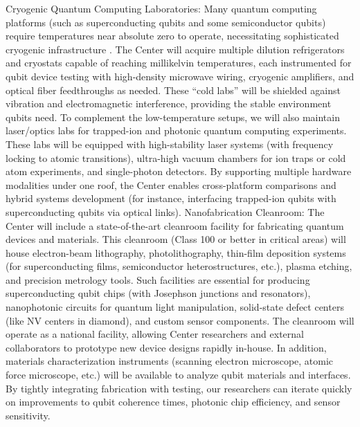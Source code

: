\documentclass[12pt]{article}
\begin{document}
Cryogenic Quantum Computing Laboratories: Many quantum computing platforms (such as superconducting qubits and some semiconductor qubits) require temperatures near absolute zero to operate, necessitating sophisticated cryogenic infrastructure . The Center will acquire multiple dilution refrigerators and cryostats capable of reaching millikelvin temperatures, each instrumented for qubit device testing with high-density microwave wiring, cryogenic amplifiers, and optical fiber feedthroughs as needed. These “cold labs” will be shielded against vibration and electromagnetic interference, providing the stable environment qubits need. To complement the low-temperature setups, we will also maintain laser/optics labs for trapped-ion and photonic quantum computing experiments. These labs will be equipped with high-stability laser systems (with frequency locking to atomic transitions), ultra-high vacuum chambers for ion traps or cold atom experiments, and single-photon detectors. By supporting multiple hardware modalities under one roof, the Center enables cross-platform comparisons and hybrid systems development (for instance, interfacing trapped-ion qubits with superconducting qubits via optical links).
Nanofabrication Cleanroom: The Center will include a state-of-the-art cleanroom facility for fabricating quantum devices and materials. This cleanroom (Class 100 or better in critical areas) will house electron-beam lithography, photolithography, thin-film deposition systems (for superconducting films, semiconductor heterostructures, etc.), plasma etching, and precision metrology tools. Such facilities are essential for producing superconducting qubit chips (with Josephson junctions and resonators), nanophotonic circuits for quantum light manipulation, solid-state defect centers (like NV centers in diamond), and custom sensor components. The cleanroom will operate as a national facility, allowing Center researchers and external collaborators to prototype new device designs rapidly in-house. In addition, materials characterization instruments (scanning electron microscope, atomic force microscope, etc.) will be available to analyze qubit materials and interfaces. By tightly integrating fabrication with testing, our researchers can iterate quickly on improvements to qubit coherence times, photonic chip efficiency, and sensor sensitivity.
\end{document}
